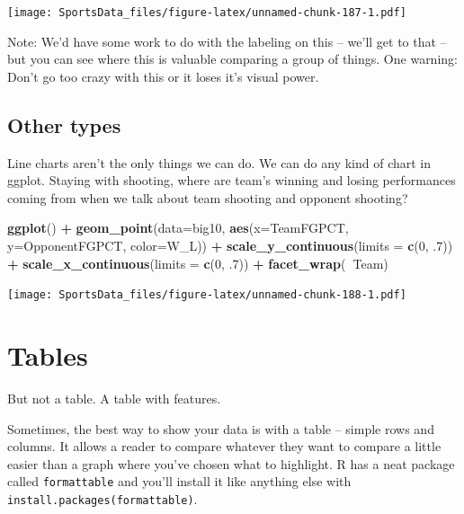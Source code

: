 \documentclass[]{book}
\newenvironment{Shaded}{\begin{snugshade}}{\end{snugshade}}
\newcommand{\DataTypeTok}[1]{\textcolor[rgb]{0.13,0.29,0.53}{#1}}
\newcommand{\DecValTok}[1]{\textcolor[rgb]{0.00,0.00,0.81}{#1}}
\newcommand{\FloatTok}[1]{\textcolor[rgb]{0.00,0.00,0.81}{#1}}
\newcommand{\KeywordTok}[1]{\textcolor[rgb]{0.13,0.29,0.53}{\textbf{#1}}}
\newcommand{\NormalTok}[1]{#1}
\newcommand{\OperatorTok}[1]{\textcolor[rgb]{0.81,0.36,0.00}{\textbf{#1}}}
\newcommand{\StringTok}[1]{\textcolor[rgb]{0.31,0.60,0.02}{#1}}
\begin{document}
\texttt{[image: SportsData\_files/figure-latex/unnamed-chunk-187-1.pdf]}

Note: We'd have some work to do with the labeling on this -- we'll get to that -- but you can see where this is valuable comparing a group of things. One warning: Don't go too crazy with this or it loses it's visual power.

\hypertarget{other-types}{%
\section{Other types}\label{other-types}}

Line charts aren't the only things we can do. We can do any kind of chart in ggplot. Staying with shooting, where are team's winning and losing performances coming from when we talk about team shooting and opponent shooting?

\begin{Shaded}
\begin{Highlighting}[]
\KeywordTok{ggplot}\NormalTok{() }\OperatorTok{+}\StringTok{ }\KeywordTok{geom_point}\NormalTok{(}\DataTypeTok{data=}\NormalTok{big10, }\KeywordTok{aes}\NormalTok{(}\DataTypeTok{x=}\NormalTok{TeamFGPCT, }\DataTypeTok{y=}\NormalTok{OpponentFGPCT, }\DataTypeTok{color=}\NormalTok{W_L)) }\OperatorTok{+}\StringTok{ }\KeywordTok{scale_y_continuous}\NormalTok{(}\DataTypeTok{limits =} \KeywordTok{c}\NormalTok{(}\DecValTok{0}\NormalTok{, }\FloatTok{.7}\NormalTok{)) }\OperatorTok{+}\StringTok{ }\KeywordTok{scale_x_continuous}\NormalTok{(}\DataTypeTok{limits =} \KeywordTok{c}\NormalTok{(}\DecValTok{0}\NormalTok{, }\FloatTok{.7}\NormalTok{)) }\OperatorTok{+}\StringTok{ }\KeywordTok{facet_wrap}\NormalTok{(}\OperatorTok{~}\NormalTok{Team)}
\end{Highlighting}
\end{Shaded}

\texttt{[image: SportsData\_files/figure-latex/unnamed-chunk-188-1.pdf]}

\hypertarget{tables}{%
\chapter{Tables}\label{tables}}

But not a table. A table with features.

Sometimes, the best way to show your data is with a table -- simple rows and columns. It allows a reader to compare whatever they want to compare a little easier than a graph where you've chosen what to highlight. R has a neat package called \texttt{formattable} and you'll install it like anything else with \texttt{install.packages(\textquotesingle{}formattable\textquotesingle{})}.
\end{document}
